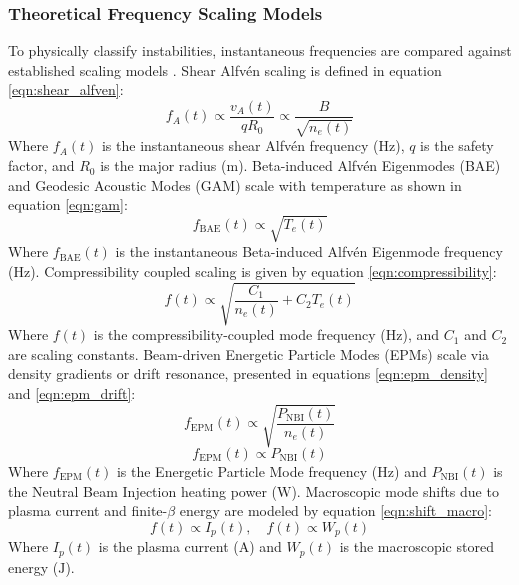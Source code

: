 \subsubsection{Theoretical Frequency Scaling Models}
To physically classify instabilities, instantaneous frequencies are compared against established scaling models \cite{Varela2024}. Shear Alfv\'en scaling is defined in equation \ref{eqn:shear_alfven}:
\begin{equation}
\label{eqn:shear_alfven}
f_A(t) \propto \frac{v_A(t)}{q R_0} \propto \frac{B}{\sqrt{n_e(t)}}
\end{equation}
Where $f_A(t)$ is the instantaneous shear Alfv\'en frequency ($\text{Hz}$), $q$ is the safety factor, and $R_0$ is the major radius ($\text{m}$). Beta-induced Alfv\'en Eigenmodes (BAE) and Geodesic Acoustic Modes (GAM) scale with temperature as shown in equation \ref{eqn:gam}:
\begin{equation}
\label{eqn:gam}
f_{\text{BAE}}(t) \propto \sqrt{T_e(t)}
\end{equation}
Where $f_{\text{BAE}}(t)$ is the instantaneous Beta-induced Alfv\'en Eigenmode frequency ($\text{Hz}$). Compressibility coupled scaling is given by equation \ref{eqn:compressibility}:
\begin{equation}
\label{eqn:compressibility}
f(t) \propto \sqrt{\frac{C_1}{n_e(t)} + C_2 T_e(t)}
\end{equation}
Where $f(t)$ is the compressibility-coupled mode frequency ($\text{Hz}$), and $C_1$ and $C_2$ are scaling constants. Beam-driven Energetic Particle Modes (EPMs) scale via density gradients or drift resonance, presented in equations \ref{eqn:epm_density} and \ref{eqn:epm_drift}:
\begin{equation}
\label{eqn:epm_density}
f_{\text{EPM}}(t) \propto \sqrt{\frac{P_{\text{NBI}}(t)}{n_e(t)}}
\end{equation}
\begin{equation}
\label{eqn:epm_drift}
f_{\text{EPM}}(t) \propto P_{\text{NBI}}(t)
\end{equation}
Where $f_{\text{EPM}}(t)$ is the Energetic Particle Mode frequency ($\text{Hz}$) and $P_{\text{NBI}}(t)$ is the Neutral Beam Injection heating power ($\text{W}$). Macroscopic mode shifts due to plasma current and finite-$\beta$ energy are modeled by equation \ref{eqn:shift_macro}:
\begin{equation}
\label{eqn:shift_macro}
f(t) \propto I_p(t), \quad f(t) \propto W_p(t)
\end{equation}
Where $I_p(t)$ is the plasma current ($\text{A}$) and $W_p(t)$ is the macroscopic stored energy ($\text{J}$).

